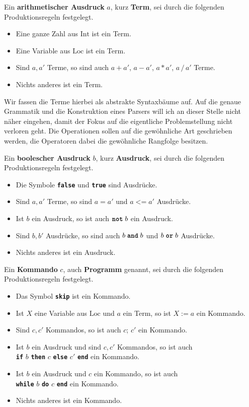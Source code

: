 \documentclass[8pt,fleqn,aspectratio=169]{beamer}
\newcommand{\strong}[1]{\textsf{\textbf{#1}}}
\newcommand{\kw}[1]{\textbf{\texttt{#1}}}
\newcommand{\code}[1]{{\texttt{#1}}}
\newcommand{\Int}{\mathrm{Int}}
\newcommand{\Loc}{\mathrm{Loc}}
\begin{document}
\begin{frame}
Ein \strong{arithmetischer Ausdruck} $a$, kurz \strong{Term}, sei durch die
folgenden Produktionsregeln festgelegt.
\begin{itemize}
\item Eine ganze Zahl aus $\Int$ ist ein Term.
\item Eine Variable aus $\Loc$ ist ein Term.
\item Sind $a,a'$ Terme, so sind auch $a+a'$, $a-a'$, $a*a'$, $a\,/\,a'$ Terme.
\item Nichts anderes ist ein Term.
\end{itemize}
{\footnotesize Wir fassen die Terme hierbei als abstrakte Syntaxbäume auf.
Auf die genaue Grammatik und die Konstruktion eines Parsers will ich
an dieser Stelle nicht näher eingehen, damit der Fokus auf die
eigentliche Problemstellung nicht verloren geht. Die Operationen sollen
auf die gewöhnliche Art geschrieben werden, die Operatoren dabei die
gewöhnliche Rangfolge besitzen.}
\end{frame}

\begin{frame}
Ein \strong{boolescher Ausdruck} $b$, kurz \strong{Ausdruck}, sei durch
die folgenden Produktionsregeln festgelegt.
\begin{itemize}
\item Die Symbole \kw{false} und \kw{true} sind Ausdrücke.
\item Sind $a,a'$ Terme, so sind $a\;\code{=}\;a'$ und $a \;\code{<=}\; a'$ Ausdrücke.
\item Ist $b$ ein Ausdruck, so ist auch $\kw{not}\;b$ ein Ausdruck.
\item Sind $b,b'$ Ausdrücke, so sind auch $b\;\kw{and}\;b$ und $b\;\kw{or}\;b$ Ausdrücke.
\item Nichts anderes ist ein Ausdruck.
\end{itemize}
\end{frame}

\begin{frame}
Ein \strong{Kommando} $c$, auch \strong{Programm} genannt, sei durch die
folgenden Produktionsregeln festgelegt.
\begin{itemize}
\item Das Symbol \kw{skip} ist ein Kommando.
\item Ist $X$ eine Variable aus $\mathrm{Loc}$ und $a$ ein Term, so ist $X:=a$ ein Kommando.
\item Sind $c,c'$ Kommandos, so ist auch $c$; $c'$ ein Kommando.
\item Ist $b$ ein Ausdruck und sind $c,c'$ Kommandos, so ist auch\\
  \kw{if} $b$ \kw{then} $c$ \kw{else} $c'$ \kw{end} ein Kommando.
\item Ist $b$ ein Ausdruck und $c$ ein Kommando, so ist auch\\
  \kw{while} $b$ \kw{do} $c$ \kw{end} ein Kommando.
\item Nichts anderes ist ein Kommando.
\end{itemize}
\end{frame}
\end{document}
